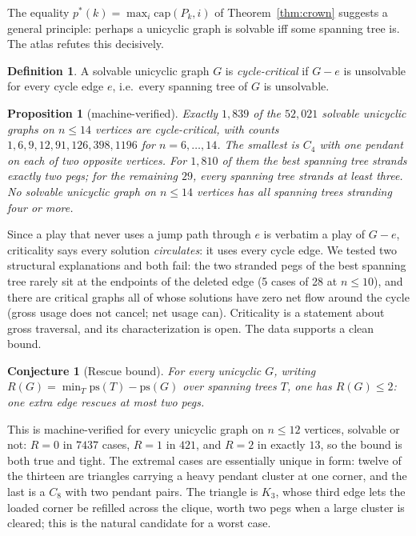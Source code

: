 \documentclass[11pt]{article}
\newtheorem{proposition}[theorem]{Proposition}
\newtheorem{conjecture}[theorem]{Conjecture}
\theoremstyle{definition}
\newtheorem{definition}[theorem]{Definition}
\newcommand{\ps}{\mathrm{ps}}
\newcommand{\cp}{\mathrm{cap}}
\begin{document}
The equality $p^*(k)=\max_i\cp(P_k,i)$ of Theorem~\ref{thm:crown}
suggests a general principle: perhaps a unicyclic graph is solvable
iff some spanning tree is. The atlas refutes this decisively.

\begin{definition}
A solvable unicyclic graph $G$ is \emph{cycle-critical} if $G-e$ is
unsolvable for every cycle edge $e$, i.e.\ every spanning tree of
$G$ is unsolvable.
\end{definition}

\begin{proposition}[machine-verified]\label{prop:critical}
Exactly $1{,}839$ of the $52{,}021$ solvable unicyclic graphs on
$n\le 14$ vertices are cycle-critical, with counts
$1,6,9,12,91,126,398,1196$ for $n=6,\dots,14$. The smallest is
$C_4$ with one pendant on each of two opposite vertices. For
$1{,}810$ of them the best spanning tree strands exactly two pegs;
for the remaining $29$, every spanning tree strands at least three.
No solvable unicyclic graph on $n\le14$ vertices has all spanning
trees stranding four or more.
\end{proposition}

Since a play that never uses a jump path through $e$ is verbatim a
play of $G-e$, criticality says every solution \emph{circulates}:
it uses every cycle edge. We tested two structural explanations and
both fail: the two stranded pegs of the best spanning tree rarely
sit at the endpoints of the deleted edge (5 cases of 28 at
$n\le10$), and there are critical graphs all of whose solutions
have zero net flow around the cycle (gross usage does not cancel;
net usage can). Criticality is a statement about gross traversal,
and its characterization is open. The data supports a clean bound.

\begin{conjecture}[Rescue bound]\label{conj:rescue}
For every unicyclic $G$, writing $R(G)=\min_T \ps(T)-\ps(G)$ over
spanning trees $T$, one has $R(G)\le 2$: one extra edge rescues at
most two pegs.
\end{conjecture}

This is machine-verified for every unicyclic graph on $n\le12$
vertices, solvable or not: $R=0$ in $7437$ cases, $R=1$ in $421$, and
$R=2$ in exactly $13$, so the bound is both true and tight. The
extremal cases are essentially unique in form: twelve of the thirteen
are triangles carrying a heavy pendant cluster at one corner, and the
last is a $C_8$ with two pendant pairs. The triangle is $K_3$, whose
third edge lets the loaded corner be refilled across the clique, worth
two pegs when a large cluster is cleared; this is the natural
candidate for a worst case.
\end{document}
